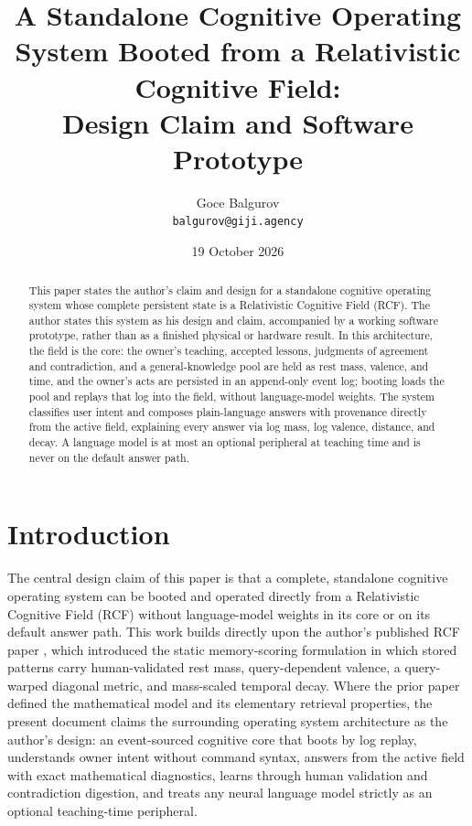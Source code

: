 \documentclass[11pt]{article}
\title{A Standalone Cognitive Operating System Booted from a Relativistic Cognitive Field:\\ Design Claim and Software Prototype}
\author{Goce Balgurov \\ \texttt{balgurov@giji.agency}}
\date{19 October 2026}
\theoremstyle{remark}
\begin{document}
\maketitle

\begin{abstract}
This paper states the author's claim and design for a standalone cognitive operating system whose complete persistent state is a Relativistic Cognitive Field (RCF). The author states this system as his design and claim, accompanied by a working software prototype, rather than as a finished physical or hardware result. In this architecture, the field is the core: the owner's teaching, accepted lessons, judgments of agreement and contradiction, and a general-knowledge pool are held as rest mass, valence, and time, and the owner's acts are persisted in an append-only event log; booting loads the pool and replays that log into the field, without language-model weights. The system classifies user intent and composes plain-language answers with provenance directly from the active field, explaining every answer via log mass, log valence, distance, and decay. A language model is at most an optional peripheral at teaching time and is never on the default answer path.
\end{abstract}

\section{Introduction}

The central design claim of this paper is that a complete, standalone cognitive operating system can be booted and operated directly from a Relativistic Cognitive Field (RCF) without language-model weights in its core or on its default answer path. This work builds directly upon the author's published RCF paper \cite{balgurov2026rcf}, which introduced the static memory-scoring formulation in which stored patterns carry human-validated rest mass, query-dependent valence, a query-warped diagonal metric, and mass-scaled temporal decay. Where the prior paper defined the mathematical model and its elementary retrieval properties, the present document claims the surrounding operating system architecture as the author's design: an event-sourced cognitive core that boots by log replay, understands owner intent without command syntax, answers from the active field with exact mathematical diagnostics, learns through human validation and contradiction digestion, and treats any neural language model strictly as an optional teaching-time peripheral.
\end{document}
